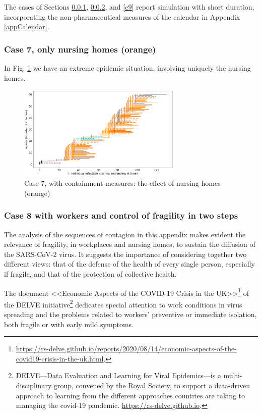 \documentclass[11pt]{article}
\begin{document}
The cases of Sections \ref{c7}, \ref{c8}, and \ref {c9} report simulation with short duration, incorporating the non-pharmaceutical measures of the calendar in Appendix \ref{appCalendar}.


\subsubsection{Case 7, only nursing homes (orange)}
\label{c7}


In Fig. \ref{0} we have an extreme epidemic situation, involving uniquely the nursing homes.

\begin{figure}[H]
\begin{center}
\includegraphics[width=0.7\textwidth]{withShort0.png}%
\caption{Case 7, with containment measures: the effect of nursing homes (orange)}
\label{0}
\end{center}
\end{figure}


\subsubsection{Case 8 with workers and control of fragility in two steps}
\label{c8}


The analysis of the sequences of contagion in this appendix makes evident the relevance of fragility, in workplaces and nursing homes, to sustain the diffusion of the SARS-CoV-2 virus. It suggests the importance of considering together two different views: that of the defense of the health of every single person, especially if fragile, and that of the protection of collective health.

The document 
<<Economic Aspects of the COVID-19 Crisis in the UK>>\footnote{\url{https://rs-delve.github.io/reports/2020/08/14/economic-aspects-of-the-covid19-crisis-in-the-uk.html}.}
of the DELVE initiative\footnote{DELVE---Data Evaluation and Learning for Viral Epidemics---is a multi-disciplinary group, convened by the Royal Society, to support a data-driven approach to learning from the different approaches countries are taking to managing the covid-19 pandemic. \url{https://rs-delve.github.io}.}
dedicates special attention to work conditions in virus spreading and the problems related to workers' preventive or immediate isolation, both fragile or with early mild symptoms.
\end{document}
